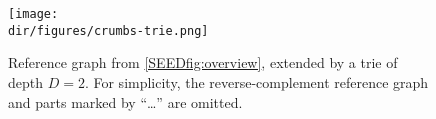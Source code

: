 \begin{figure}[t]
    \centering
	\texttt{[image: \\dir/figures/crumbs-trie.png]}
	\caption{Reference graph from \cref{SEEDfig:overview}, extended by a trie of
	depth $D=2$. For simplicity, the reverse-complement reference graph and
	parts marked by ``\dots'' are omitted.}
	\label{SEEDfig:trie}
\end{figure}